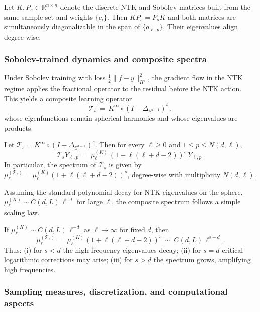 \documentclass[a4paper]{article}
\begin{document}
\begin{theorem}
Let $K, P_s \in \mathbb{R}^{n\times n}$ denote the discrete NTK and Sobolev matrices built from the same sample set and weights $\{c_i\}$. Then $KP_s = P_s K$ and both matrices are simultaneously diagonalizable in the span of $\{a_{\ell,p}\}$. Their eigenvalues align degree-wise.
\end{theorem}

\subsubsection{Sobolev-trained dynamics and composite spectra}

Under Sobolev training with loss $\tfrac{1}{2}\|f-y\|_{H^s}^2$, the gradient flow in the NTK regime applies the fractional operator to the residual before the NTK action. This yields a composite learning operator
\[
\mathcal{T}_s \,=\, K^{\infty} \circ (I - \Delta_{\mathbb{S}^{d-1}})^{s}\,,
\]
whose eigenfunctions remain spherical harmonics and whose eigenvalues are products.

\begin{theorem}
Let $\mathcal{T}_s = K^{\infty} \circ (I - \Delta_{\mathbb{S}^{d-1}})^{s}$. Then for every $\ell \ge 0$ and $1 \le p \le N(d,\ell)$,
\[
\mathcal{T}_s Y_{\ell,p} \,=\, \mu_\ell^{(K)} \,(1+\ell(\ell+d-2))^{s}\, Y_{\ell,p}\,.
\]
In particular, the spectrum of $\mathcal{T}_s$ is given by $\mu_\ell^{(\mathcal{T}_s)} = \mu_\ell^{(K)} (1+\ell(\ell+d-2))^{s}$, degree-wise with multiplicity $N(d,\ell)$.
\end{theorem}

Assuming the standard polynomial decay for NTK eigenvalues on the sphere, $\mu_\ell^{(K)} \sim C(d,L)\, \ell^{-d}$ for large $\ell$, the composite spectrum follows a simple scaling law.

\begin{theorem}
If $\mu_\ell^{(K)} \sim C(d,L)\, \ell^{-d}$ as $\ell \to \infty$ for fixed $d$, then
\[
\mu_\ell^{(\mathcal{T}_s)} \,=\, \mu_\ell^{(K)} (1+\ell(\ell+d-2))^{s} \,\sim\, C(d,L)\, \ell^{s-d}\,.
\]
Thus: (i) for $s<d$ the high-frequency eigenvalues decay; (ii) for $s=d$ critical logarithmic corrections may arise; (iii) for $s>d$ the spectrum grows, amplifying high frequencies.
\end{theorem}

\subsubsection{Sampling measures, discretization, and computational aspects}
\end{document}
